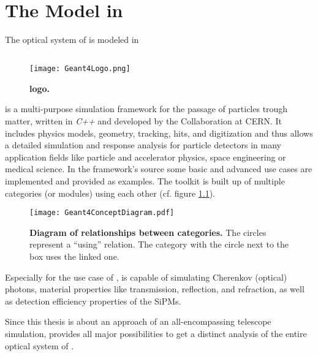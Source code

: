 \chapter{The \iceact Model in \geant}

The optical system of \iceact is modeled in \geant 

\section{\geant}

\begin{wrapfigure}{r}{0.5\textwidth}
	\centering
	\texttt{[image: Geant4Logo.png]}
	\caption[\geant logo]{\textbf{\geant logo.} \cite{geant4:logo}}	
\end{wrapfigure}
\geant is a multi-purpose simulation framework for the passage of particles trough matter, written in \textit{C++} and developed by the \geant Collaboration at CERN. It includes physics models, geometry, tracking, hits, and digitization and thus allows a detailed simulation and response analysis for particle detectors in many application fields like particle and accelerator physics, space engineering or medical science. In the framework's source some basic and advanced use cases are implemented and provided as examples. The toolkit is built up of multiple categories (or modules) using each other (cf. figure \ref{geant4:categories}).~\cite{geant4}

\begin{figure}[H]
	\centering
	\texttt{[image: Geant4ConceptDiagram.pdf]}
	\caption[\geant category diagram]{\textbf{Diagram of relationships between \geant categories.} \cite{geant4} The circles represent a \enquote{using} relation. The category with the circle next to the box uses the linked one.}	
	\label{geant4:categories}
\end{figure}

Especially for the use case of \iceact, \geant is capable of simulating Cherenkov (optical) photons, material properties like transmission, reflection, and refraction, as well as detection efficiency properties of the SiPMs.

Since this thesis is about an approach of an all-encompassing telescope simulation, \geant provides all major possibilities to get a distinct analysis of the entire optical system of \iceact.

